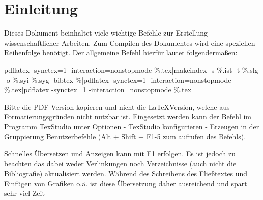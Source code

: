 \chapter{Einleitung}
Dieses Dokument beinhaltet viele wichtige Befehle zur Erstellung wissenschaftlicher Arbeiten. Zum Compilen des Dokumentes wird eine speziellen Reihenfolge benötigt. Der allgemeine Befehl hierfür lautet folgendermaßen:

pdflatex -synctex=1 -interaction=nonstopmode \%.tex|makeindex -s \%.ist -t \%.slg -o \%.syi \%.syg| bibtex \%|pdflatex -synctex=1 -interaction=nonstopmode \%.tex|pdflatex -synctex=1 -interaction=nonstopmode \%.tex

Bitte die PDF-Version kopieren und nicht die \LaTeX Version, welche aus Formatierungsgründen nicht nutzbar ist. Eingesetzt werden kann der Befehl im Programm TexStudio unter Optionen - TexStudio konfigurieren - Erzeugen in der Gruppierung Benutzerbefehle (Alt + Shift + F1-5 zum aufrufen des Befehls).

Schnelles Übersetzen und Anzeigen kann mit F1 erfolgen. Es ist jedoch zu beachten das dabei weder Verlinkungen noch Verzeichnisse (auch nicht die Bibliografie) aktualisiert werden. Während des Schreibens des Fließtextes und Einfügen von Grafiken o.ä. ist diese Übersetzung daher ausreichend und spart sehr viel Zeit

